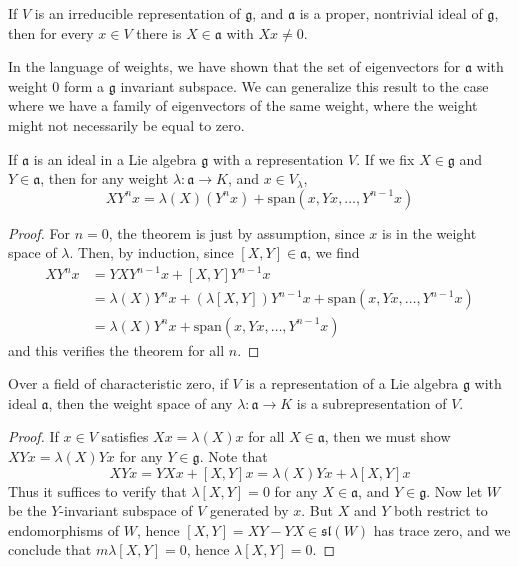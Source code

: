 \begin{corollary}
    If $V$ is an irreducible representation of $\mathfrak{g}$, and $\mathfrak{a}$ is a proper, nontrivial ideal of $\mathfrak{g}$, then for every $x \in V$ there is $X \in \mathfrak{a}$ with $Xx \neq 0$.
\end{corollary}

In the language of weights, we have shown that the set of eigenvectors for $\mathfrak{a}$ with weight 0 form a $\mathfrak{g}$ invariant subspace. We can generalize this result to the case where we have a family of eigenvectors of the same weight, where the weight might not necessarily be equal to zero.

\begin{lemma}
    If $\mathfrak{a}$ is an ideal in a Lie algebra $\mathfrak{g}$ with a representation $V$. If we fix $X \in \mathfrak{g}$ and $Y \in \mathfrak{a}$, then for any weight $\lambda: \mathfrak{a} \to K$, and $x \in V_\lambda$,
    \[ XY^nx = \lambda(X)(Y^n x) + \text{span}(x,Yx, \dots, Y^{n-1}x) \]
\end{lemma}
\begin{proof}
    For $n = 0$, the theorem is just by assumption, since $x$ is in the weight space of $\lambda$. Then, by induction, since $[X,Y] \in \mathfrak{a}$, we find
    \begin{align*}
        XY^nx &= YXY^{n-1}x + [X,Y]Y^{n-1}x\\
        &= \lambda(X)Y^nx + \left( \lambda [X,Y] \right) Y^{n-1} x + \text{span}(x,Yx,\dots,Y^{n-1}x)\\
        &= \lambda(X)Y^nx + \text{span}(x,Yx,\dots,Y^{n-1}x)
    \end{align*}
    and this verifies the theorem for all $n$.
\end{proof}

\begin{theorem}
    Over a field of characteristic zero, if $V$ is a representation of a Lie algebra $\mathfrak{g}$ with ideal $\mathfrak{a}$, then the weight space of any $\lambda: \mathfrak{a} \to K$ is a subrepresentation of $V$.
\end{theorem}
\begin{proof}
    If $x \in V$ satisfies $Xx = \lambda(X)x$ for all $X \in \mathfrak{a}$, then we must show $XYx = \lambda(X)Yx$ for any $Y \in \mathfrak{g}$. Note that
    \[ XYx = YXx + [X,Y]x = \lambda(X) Yx + \lambda[X,Y]x \]
    Thus it suffices to verify that $\lambda[X,Y] = 0$ for any $X \in \mathfrak{a}$, and $Y \in \mathfrak{g}$. Now let $W$ be the $Y$-invariant subspace of $V$ generated by $x$. But $X$ and $Y$ both restrict to endomorphisms of $W$, hence $[X,Y] = XY - YX \in \mathfrak{sl}(W)$ has trace zero, and we conclude that $m \lambda[X,Y] = 0$, hence $\lambda [X,Y] = 0$.
\end{proof}

